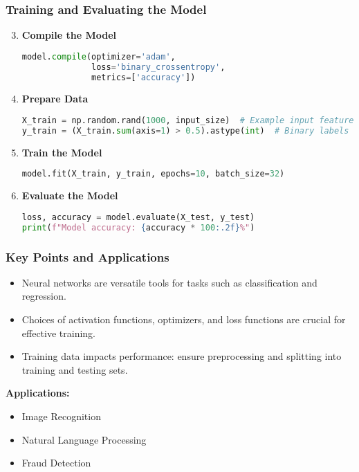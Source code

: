 \documentclass[aspectratio=169]{beamer}
\begin{document}
\begin{frame}[fragile]
  \frametitle{Training and Evaluating the Model}
  \begin{enumerate}
    \setcounter{enumi}{2}
    \item \textbf{Compile the Model}
    \begin{lstlisting}[language=Python]
model.compile(optimizer='adam',
              loss='binary_crossentropy',
              metrics=['accuracy'])
    \end{lstlisting}

    \item \textbf{Prepare Data}
    \begin{lstlisting}[language=Python]
X_train = np.random.rand(1000, input_size)  # Example input features
y_train = (X_train.sum(axis=1) > 0.5).astype(int)  # Binary labels
    \end{lstlisting}

    \item \textbf{Train the Model}
    \begin{lstlisting}[language=Python]
model.fit(X_train, y_train, epochs=10, batch_size=32)
    \end{lstlisting}

    \item \textbf{Evaluate the Model}
    \begin{lstlisting}[language=Python]
loss, accuracy = model.evaluate(X_test, y_test)
print(f"Model accuracy: {accuracy * 100:.2f}%")
    \end{lstlisting}
  \end{enumerate}
\end{frame}

\begin{frame}
  \frametitle{Key Points and Applications}
  \begin{itemize}
    \item Neural networks are versatile tools for tasks such as classification and regression.
    \item Choices of activation functions, optimizers, and loss functions are crucial for effective training.
    \item Training data impacts performance: ensure preprocessing and splitting into training and testing sets.
  \end{itemize}

  \textbf{Applications:}
  \begin{itemize}
    \item Image Recognition
    \item Natural Language Processing
    \item Fraud Detection
  \end{itemize}
\end{frame}
\end{document}
